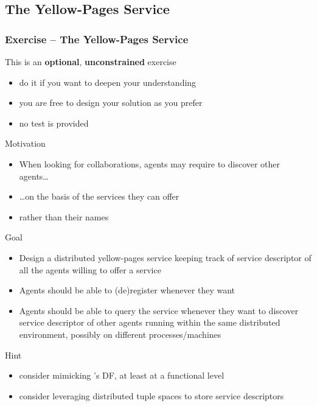 \documentclass[presentation]{beamer}\mode<presentation>{\usetheme{AMSCesenaPurpleAndGold}}
\begin{document}
\startExercise

\subsection{The Yellow-Pages Service}

\begin{frame}[allowframebreaks]
\frametitle{Exercise \currentExercise{} -- The Yellow-Pages Service}
	\begin{alertblock}{This is an \textbf{optional}, \textbf{unconstrained} exercise}
		\begin{itemize}
			\item do it if you want to deepen your understanding
			\item you are free to design your solution as you prefer
			\item no test is provided
		\end{itemize}
	\end{alertblock}

	\begin{block}{Motivation}
		\begin{itemize}
			\item When looking for collaborations, agents may require to discover other agents\ldots
			\item \ldots on the basis of the services they can offer
			\item rather than their names
		\end{itemize}
	\end{block}

	\begin{block}{Goal}
		\begin{itemize}
			\item Design a distributed yellow-pages service keeping track of \alert{service descriptor} of all the agents willing to offer a service
			
			\item Agents should be able to (de)register whenever they want

			\item Agents should be able to query the service whenever they want to discover service descriptor of other agents running within the same distributed environment, possibly on different processes/machines
		\end{itemize}
	\end{block}

	\begin{exampleblock}{Hint}
		\begin{itemize}
			\item consider mimicking \jade{}'s DF, at least at a functional level
			\item consider leveraging distributed tuple spaces to store service descriptors 
		\end{itemize}
	\end{exampleblock}
\end{frame}
\end{document}
